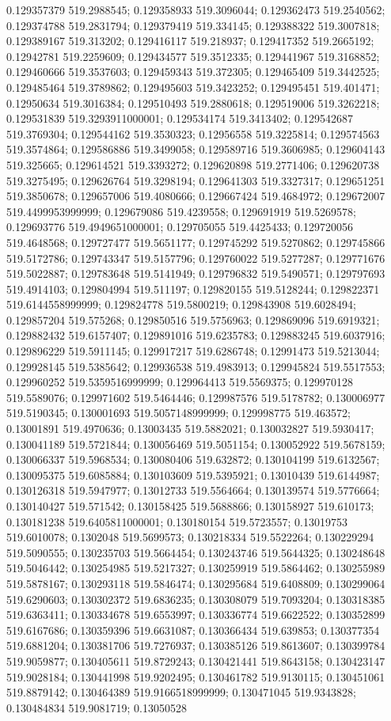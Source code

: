 0.129357379 519.2988545; 0.129358933 519.3096044; 0.129362473 519.2540562; 0.129374788 519.2831794; 0.129379419 519.334145; 0.129388322 519.3007818; 0.129389167 519.313202; 0.129416117 519.218937; 0.129417352 519.2665192; 0.12942781 519.2259609; 0.129434577 519.3512335; 0.129441967 519.3168852; 0.129460666 519.3537603; 0.129459343 519.372305; 0.129465409 519.3442525; 0.129485464 519.3789862; 0.129495603 519.3423252; 0.129495451 519.401471; 0.12950634 519.3016384; 0.129510493 519.2880618; 0.129519006 519.3262218; 0.129531839 519.3293911000001; 0.129534174 519.3413402; 0.129542687 519.3769304; 0.129544162 519.3530323; 0.12956558 519.3225814; 0.129574563 519.3574864; 0.129586886 519.3499058; 0.129589716 519.3606985; 0.129604143 519.325665; 0.129614521 519.3393272; 0.129620898 519.2771406; 0.129620738 519.3275495; 0.129626764 519.3298194; 0.129641303 519.3327317; 0.129651251 519.3850678; 0.129657006 519.4080666; 0.129667424 519.4684972; 0.129672007 519.4499953999999; 0.129679086 519.4239558; 0.129691919 519.5269578; 0.129693776 519.4949651000001; 0.129705055 519.4425433; 0.129720056 519.4648568; 0.129727477 519.5651177; 0.129745292 519.5270862; 0.129745866 519.5172786; 0.129743347 519.5157796; 0.129760022 519.5277287; 0.129771676 519.5022887; 0.129783648 519.5141949; 0.129796832 519.5490571; 0.129797693 519.4914103; 0.129804994 519.511197; 0.129820155 519.5128244; 0.129822371 519.6144558999999; 0.129824778 519.5800219; 0.129843908 519.6028494; 0.129857204 519.575268; 0.129850516 519.5756963; 0.129869096 519.6919321; 0.129882432 519.6157407; 0.129891016 519.6235783; 0.129883245 519.6037916; 0.129896229 519.5911145; 0.129917217 519.6286748; 0.12991473 519.5213044; 0.129928145 519.5385642; 0.129936538 519.4983913; 0.129945824 519.5517553; 0.129960252 519.5359516999999; 0.129964413 519.5569375; 0.129970128 519.5589076; 0.129971602 519.5464446; 0.129987576 519.5178782; 0.130006977 519.5190345; 0.130001693 519.5057148999999; 0.129998775 519.463572; 0.13001891 519.4970636; 0.13003435 519.5882021; 0.130032827 519.5930417; 0.130041189 519.5721844; 0.130056469 519.5051154; 0.130052922 519.5678159; 0.130066337 519.5968534; 0.130080406 519.632872; 0.130104199 519.6132567; 0.130095375 519.6085884; 0.130103609 519.5395921; 0.13010439 519.6144987; 0.130126318 519.5947977; 0.13012733 519.5564664; 0.130139574 519.5776664; 0.130140427 519.571542; 0.130158425 519.5688866; 0.130158927 519.610173; 0.130181238 519.6405811000001; 0.130180154 519.5723557; 0.13019753 519.6010078; 0.1302048 519.5699573; 0.130218334 519.5522264; 0.130229294 519.5090555; 0.130235703 519.5664454; 0.130243746 519.5644325; 0.130248648 519.5046442; 0.130254985 519.5217327; 0.130259919 519.5864462; 0.130255989 519.5878167; 0.130293118 519.5846474; 0.130295684 519.6408809; 0.130299064 519.6290603; 0.130302372 519.6836235; 0.130308079 519.7093204; 0.130318385 519.6363411; 0.130334678 519.6553997; 0.130336774 519.6622522; 0.130352899 519.6167686; 0.130359396 519.6631087; 0.130366434 519.639853; 0.130377354 519.6881204; 0.130381706 519.7276937; 0.130385126 519.8613607; 0.130399784 519.9059877; 0.130405611 519.8729243; 0.130421441 519.8643158; 0.130423147 519.9028184; 0.130441998 519.9202495; 0.130461782 519.9130115; 0.130451061 519.8879142; 0.130464389 519.9166518999999; 0.130471045 519.9343828; 0.130484834 519.9081719; 0.13050528 